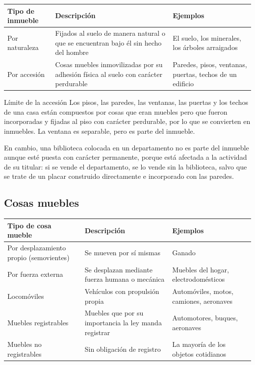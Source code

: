 \documentclass[12pt,oneside]{book}
\newenvironment{tabla}{%
    \par\medskip\begingroup\small\renewcommand{\arraystretch}{1.3}\noindent\ignorespaces
}{%
    \par\endgroup\medskip
}
\begin{document}
\begin{tabla}
\begin{tabularx}{\textwidth}{B{2.8cm}YY}
\toprule
Tipo de inmueble & \textbf{Descripción} & \textbf{Ejemplos} \\
\midrule
Por naturaleza & Fijados al suelo de manera natural o que se encuentran bajo él sin hecho del hombre & El suelo, los minerales, los árboles arraigados \\
Por accesión & Cosas muebles inmovilizadas por su adhesión física al suelo con carácter perdurable & Paredes, pisos, ventanas, puertas, techos de un edificio \\
\bottomrule
\end{tabularx}
\end{tabla}

\begin{example}{Límite de la accesión}
Los pisos, las paredes, las ventanas, las puertas y los techos de una casa están compuestos por cosas que eran muebles pero que fueron incorporadas y fijadas al piso con carácter perdurable, por lo que se convierten en inmuebles. La ventana es separable, pero es parte del inmueble.

En cambio, una biblioteca colocada en un departamento no es parte del inmueble aunque esté puesta con carácter permanente, porque está afectada a la actividad de su titular: si se vende el departamento, se lo vende sin la biblioteca, salvo que se trate de un placar construido directamente e incorporado con las paredes.
\end{example}

\subsection{Cosas muebles}

\begin{tabla}
\begin{tabularx}{\textwidth}{B{3.8cm}YY}
\toprule
Tipo de cosa mueble & \textbf{Descripción} & \textbf{Ejemplos} \\
\midrule
Por desplazamiento propio (semovientes) & Se mueven por sí mismas & Ganado \\
Por fuerza externa & Se desplazan mediante fuerza humana o mecánica & Muebles del hogar, electrodomésticos \\
Locomóviles & Vehículos con propulsión propia & Automóviles, motos, camiones, aeronaves \\
Muebles registrables & Muebles que por su importancia la ley manda registrar & Automotores, buques, aeronaves \\
Muebles no registrables & Sin obligación de registro & La mayoría de los objetos cotidianos \\
\bottomrule
\end{tabularx}
\end{tabla}
\end{document}
